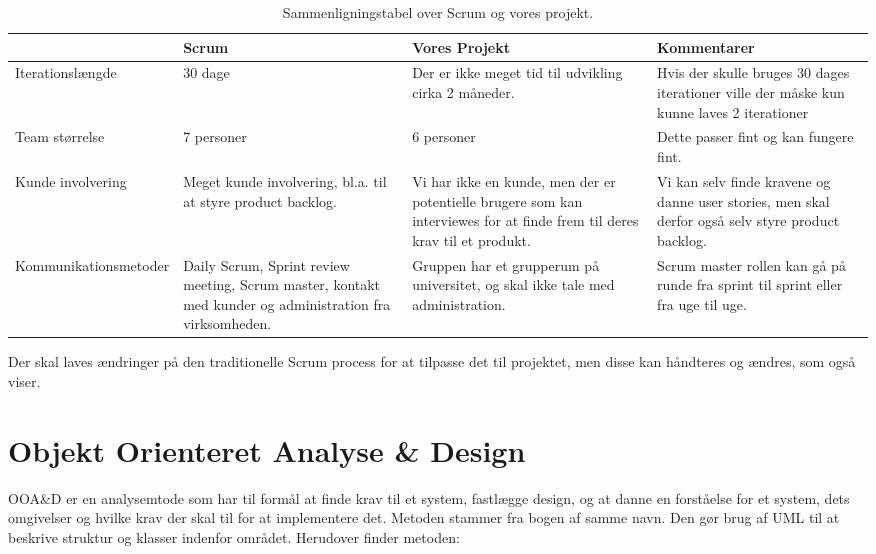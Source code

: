 \begin{sidewaystable}
      \begin{tabular}{p{5cm}p{5cm}p{5cm}p{5cm}}
	       				 & Scrum  & Vores Projekt & Kommentarer  \\ \hline
	   Iterationslængde  		
	   		& 30 dage 
	   		& Der er ikke meget tid til udvikling cirka 2 måneder. 
	   		& Hvis der skulle bruges 30 dages iterationer ville der måske kun kunne laves 2 iterationer\\
	   		
	   Team størrelse    		
	   		& 7 personer
	   		& 6 personer 
	   		& Dette passer fint og kan fungere fint. \\
	   		
	   Kunde involvering 		
	   		& Meget kunde involvering, bl.a. til at styre product backlog.
	   		& Vi har ikke en kunde, men der er potentielle brugere som kan interviewes for at finde frem til deres krav til et produkt.
	   		& Vi kan selv finde kravene og danne user stories, men skal derfor også selv styre product backlog.\\
	   		
	   Kommunikationsmetoder	
	   		& Daily Scrum, Sprint review meeting, Scrum master, kontakt med kunder og administration fra virksomheden.
	   		& Gruppen har et grupperum på universitet, og skal ikke tale med administration. 
	   		& Scrum master rollen kan gå på runde fra sprint til sprint eller fra uge til uge. \\
    \end{tabular}
  \caption{Sammenligningstabel over Scrum og vores projekt.}\label{tabel:sammenligningstabel}
\end{sidewaystable}

Der skal laves ændringer på den traditionelle Scrum process  for at tilpasse det til projektet, men disse kan håndteres og ændres, som  også viser.

\section{Objekt Orienteret Analyse \& Design}

OOA\&D er en analysemtode som har til formål at finde krav til et system, fastlægge design, og at danne en forståelse for et system, dets omgivelser og hvilke krav der skal til for at implementere det.
Metoden stammer fra bogen af samme navn.\citep{OOA&D2001}
Den gør brug af UML til at beskrive struktur og klasser indenfor området.
Herudover finder metoden:

